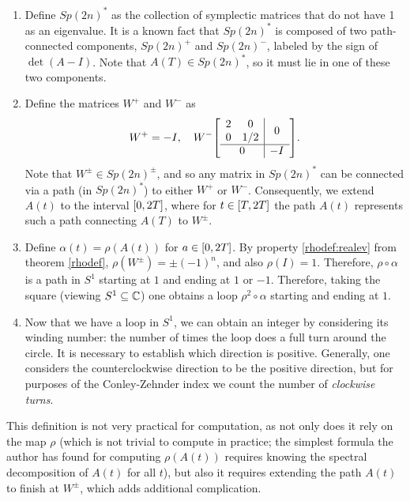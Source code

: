 \begin{algorithm}
\begin{enumerate}[algorithm]
\item Define $Sp(2n)^*$ as the collection of symplectic matrices that do not have 1 as an eigenvalue. It is a known fact \cite[proposition~7.1.4]{audin} that $Sp(2n)^*$ is composed of two path-connected components, $Sp(2n)^+$ and $Sp(2n)^-$, labeled by the sign of $\det(A-I)$. Note that $A(T) \in Sp(2n)^*$, so it must lie in one of these two components.
\item\label{maslov:step2} Define the matrices $W^+$ and $W^-$ as
\begin{equation}
W^+ = - I, \quad W^- \mleft[\begin{array}{c|c}
\begin{matrix} 2 & 0 \\ 0 & 1/2 \end{matrix} & 0\\
\hline
0 & -I
\end{array}\mright].
\end{equation}
Note that $W^\pm \in Sp(2n)^\pm$, and so any matrix in $Sp(2n)^*$ can be connected via a path (in $Sp(2n)^*$) to either $W^+$ or $W^-$. Consequently, we extend $A(t)$ to the interval $\interval 0 {2T}$, where for $t \in \interval T {2T}$ the path $A(t)$ represents such a path connecting $A(T)$ to $W^\pm$.
\item Define $\alpha(t) = \rho(A(t))$ for $a \in \interval 0 {2T}$. By property \ref{rhodef:realev} from theorem \ref{rhodef}, $\rho(W^\pm) = \pm(-1)^n$, and also $\rho(I) = 1$. Therefore, $\rho \circ \alpha$ is a path in $S^1$ starting at $1$ and ending at $1$ or $-1$. Therefore, taking the square (viewing $S^1 \subseteq \mathbb{C}$) one obtains a loop $\rho^2 \circ \alpha$ starting and ending at $1$.
\item Now that we have a loop in $S^1$, we can obtain an integer by considering its winding number: the number of times the loop does a full turn around the circle. It is necessary to establish which direction is positive. Generally, one considers the counterclockwise direction to be the positive direction, but for purposes of the Conley-Zehnder index we count the number of \emph{clockwise turns}.
\end{enumerate}
\end{algorithm}

This definition is not very practical for computation, as not only does it rely on the map $\rho$ (which is not trivial to compute in practice; the simplest formula the author has found for computing $\rho(A(t))$ requires knowing the spectral decomposition of $A(t)$ for all $t$), but also it requires extending the path $A(t)$ to finish at $W^\pm$, which adds additional complication.

